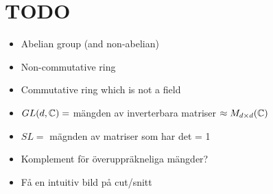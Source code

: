 \section{TODO}\par
\begin{itemize}
  \item Abelian group (and non-abelian)
  \item Non-commutative ring
  \item Commutative ring which is not a field
  \item $GL(d,\mathbb{C}) = $ mängden av inverterbara matriser $\approx M_{d\times d}(\mathbb{C})$ 
  \item $SL=$ mägnden av matriser som har det = 1
  \item Komplement för överuppräkneliga mängder?
  \item Få en intuitiv bild på cut/snitt 
\end{itemize}
